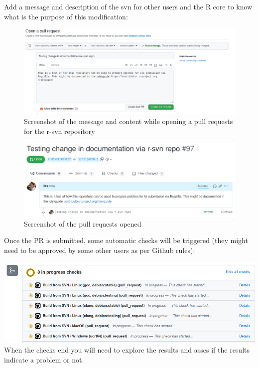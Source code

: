 \documentclass[
]{book}
\begin{document}
Add a message and description of the svn for other users and the R core to know what is the purpose of this modification:

\begin{figure}
\centering
\includegraphics{img/rsvn_PR_message.png}
\caption{Screenshot of the message and content while opening a pull requests for the r-svn repository}
\end{figure}

\begin{figure}
\centering
\includegraphics{img/rsvn_PR_created.png}
\caption{Screenshot of the pull requests opened}
\end{figure}

Once the PR is submitted, some automatic checks will be triggered (they might need to be approved by some other users as per Github rules):

\includegraphics{img/rsvn_PR_automatic_checks.png}
When the checks end you will need to explore the results and asses if the results indicate a problem or not.
\end{document}
